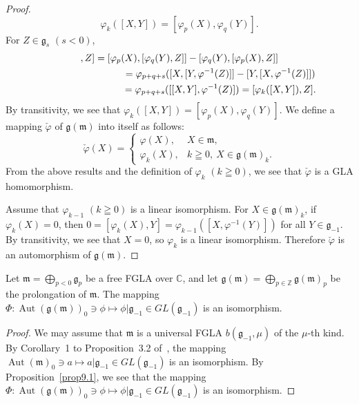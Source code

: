 \documentclass[pdftex]{sigma}
\numberwithin{equation}{section}
\numberwithin{theorem}{section}
\numberwithin{proposition}{section}
\numberwithin{lemma}{section}
\numberwithin{corollary}{section}
\numberwithin{definition}{section}
\numberwithin{example}{section}
\numberwithin{remark}{section}
\numberwithin{note}{section}
\newcommand{\Aut}{\operatorname{Aut}}
\begin{document}
\begin{proof}
\[
\varphi_k([X,Y])=[\varphi_p(X),\varphi_q(Y)].
\]
For $Z\in\mathfrak g_s$ $(s<0)$,
\begin{gather*}
 [[\varphi_p(X),\varphi_q(Y)],Z]
=[\varphi_p(X),[\varphi_q(Y),Z]]-[\varphi_q(Y),[\varphi_p(X),Z]] \\
\hphantom{[[\varphi_p(X),\varphi_q(Y)],Z]}{}
=\varphi_{p+q+s}([X,[Y,\varphi^{-1}(Z)]]-[Y,[X,\varphi^{-1}(Z)]]) \\
\hphantom{[[\varphi_p(X),\varphi_q(Y)],Z]}{}
=\varphi_{p+q+s}([[X,Y],\varphi^{-1}(Z)])
=[\varphi_k([X,Y]),Z].
\end{gather*}
By transitivity, we see that
$\varphi_k([X,Y])=[\varphi_p(X),\varphi_q(Y)]$.
We def\/ine a mapping $\check{\varphi}$ of $\mathfrak g(\mathfrak m)$ into
itself as follows:
\[\check{\varphi}(X)=
\begin{cases}
\varphi(X), & X\in\mathfrak m, \\
\varphi_k(X), & k\geqq0, \ X\in\mathfrak g(\mathfrak m)_k.
\end{cases}
\]
From the above results and the def\/inition of $\varphi_k$ $(k\geqq0)$,
we see that $\check{\varphi}$ is a GLA homomorphism.

Assume that $\varphi_{k-1}$ $(k\geqq0)$ is a linear isomorphism.
For $X\in \mathfrak g(\mathfrak m)_k$, if $\varphi_k(X)=0$, then
$0=[\varphi_k(X),Y]=\varphi_{k-1}([X,\varphi^{-1}(Y)])$ for all
$Y\in\mathfrak g_{-1}$. By transitivity, we see that $X=0$,
so $\varphi_k$ is a linear isomorphism.
Therefore $\check{\varphi}$ is an automorphism of $\mathfrak g(\mathfrak m)$.
\end{proof}

\begin{theorem}\label{thm9.1} Let $\mathfrak m=\bigoplus\limits_{p<0}\mathfrak g_p$ be a
free FGLA over $\mathbb C$, and let
$\mathfrak g(\mathfrak m)
=\bigoplus\limits_{p\in\mathbb Z}\mathfrak g(\mathfrak m)_p$
be the prolongation of $\mathfrak m$.
The mapping $\Phi:\Aut(\mathfrak g(\mathfrak m))_0\ni\phi\mapsto \phi|\mathfrak g_{-1}\in GL(\mathfrak g_{-1})$ is an isomorphism.
\end{theorem}

\begin{proof}
We may assume that $\mathfrak m$ is a universal FGLA $b(\mathfrak g_{-1},\mu)$ of the $\mu$-th kind.
By Corollary~1 to Proposition~3.2 of~\cite{tan70:1},
the mapping $\Aut(\mathfrak m)_0\ni a\mapsto a|\mathfrak g_{-1}\in
GL(\mathfrak g_{-1})$ is an isomorphism.
By Proposition~\ref{prop9.1}, we see that the mapping
$\Phi:\Aut(\mathfrak g(\mathfrak m))_0\ni\phi\mapsto \phi|\mathfrak g_{-1}\in GL(\mathfrak g_{-1})$ is an isomorphism.
\end{proof}
\end{document}
